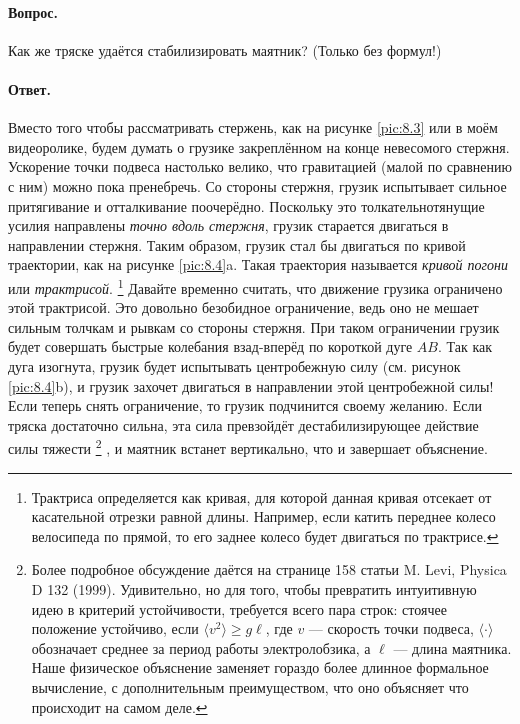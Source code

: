\paragraph{Вопрос.}
Как же тряске удаётся стабилизировать маятник?
(Только без формул!)

\paragraph{Ответ.}
Вместо того чтобы рассматривать стержень, как на рисунке
\ref{pic:8.3} или в моём видеоролике, будем думать о грузике закреплённом на конце невесомого стержня.
Ускорение точки подвеса настолько велико, что гравитацией (малой по сравнению с ним) можно пока пренебречь.
Со стороны стержня, грузик испытывает сильное притягивание и отталкивание поочерёдно.
Поскольку это толкательнотянущие усилия направлены \emph{точно вдоль стержня}, грузик старается двигаться в направлении стержня.
Таким образом, грузик стал бы двигаться по кривой траектории, как на рисунке \ref{pic:8.4}a.
Такая траектория называется \emph{кривой погони} или \emph{трактрисой}.%
\footnote{Трактриса определяется как кривая, для которой данная кривая отсекает от касательной отрезки равной длины.
Например, если катить переднее колесо велосипеда по прямой, то его заднее колесо будет двигаться по трактрисе.}
Давайте временно считать, что движение грузика ограничено этой трактрисой.
Это довольно безобидное ограничение, ведь оно не мешает сильным толчкам и рывкам со стороны стержня.
При таком ограничении грузик будет совершать быстрые колебания взад-вперёд по короткой дуге $AB$.
Так как дуга изогнута, грузик будет испытывать центробежную силу (см. рисунок \ref{pic:8.4}b), и грузик захочет двигаться в направлении этой центробежной силы!
Если теперь снять ограничение, то грузик подчинится своему желанию.
Если тряска достаточно сильна, эта сила превзойдёт дестабилизирующее действие силы тяжести%
\footnote{Более подробное обсуждение даётся на странице 158 статьи  M. Levi, Physica D 132 (1999).
Удивительно, но для того, чтобы превратить интуитивную идею в критерий устойчивости, требуется всего пара строк: стоячее положение устойчиво, если  $
\langle v^2 \rangle \ge g \ell$,
где $v$ --- скорость точки подвеса, $\langle \cdot \rangle$ обозначает среднее за период работы электролобзика, а $\ell$ --- длина маятника.
Наше физическое объяснение заменяет гораздо более длинное формальное вычисление, с дополнительным преимуществом, что оно объясняет что происходит на самом деле.}%
, и маятник встанет вертикально,
что и завершает объяснение.

